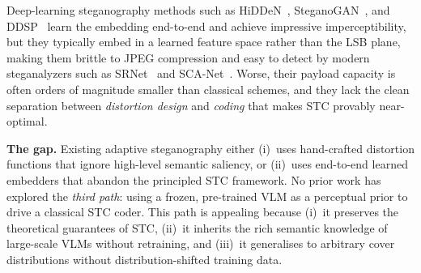\documentclass[10pt,a4paper]{article}
\begin{document}
Deep-learning steganography methods such as
HiDDeN~\cite{zhu2019hidden}, SteganoGAN~\cite{zhang2019steganogan}, and
DDSP~\cite{zhou2022ddsp} learn the embedding end-to-end and achieve
impressive imperceptibility, but they typically embed in a learned
feature space rather than the LSB plane, making them brittle to JPEG
compression and easy to detect by modern steganalyzers such as
SRNet~\cite{boroumand2019srnet} and SCA-Net~\cite{xu2017scanet}. Worse,
their payload capacity is often orders of magnitude smaller than
classical schemes, and they lack the clean separation between
\emph{distortion design} and \emph{coding} that makes STC provably
near-optimal.

\textbf{The gap.} Existing adaptive steganography either (i)~uses
hand-crafted distortion functions that ignore high-level semantic
saliency, or (ii)~uses end-to-end learned embedders that abandon the
principled STC framework. No prior work has explored the
\emph{third path}: using a frozen, pre-trained VLM as a perceptual
prior to drive a classical STC coder. This path is appealing because
(i)~it preserves the theoretical guarantees of STC, (ii)~it inherits
the rich semantic knowledge of large-scale VLMs without retraining, and
(iii)~it generalises to arbitrary cover distributions without
distribution-shifted training data.
\end{document}
